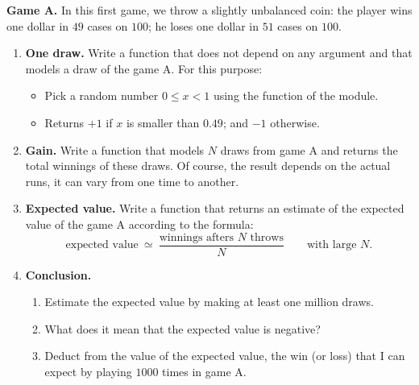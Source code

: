 \documentclass[11pt,class=report,crop=false]{standalone}
\begin{document}
\begin{activite}


\textbf{Game A.} In this first game, we throw a slightly unbalanced coin: the player wins one dollar in $49$ cases on $100$; he loses one dollar in $51$ cases on $100$.

\begin{enumerate}
  \item \textbf{One draw.}
  Write a function  that does not depend on any argument and that models a draw of the game A. For this purpose:
  \begin{itemize}
    \item Pick a random number $0 \le x < 1$ using the  function of the  module.
    \item Returns $+1$ if $x$ is smaller than $0.49$; and $-1$ otherwise.
  \end{itemize}
  
  
  \item \textbf{Gain.} Write a function  that models $N$ draws from game A and returns the total winnings of these draws. Of course, the result depends on the actual runs, it can vary from one time to another.
  
  \item \textbf{Expected value.} Write a function  that returns an estimate of the expected value of the game A according to the formula:
   $$\text{expected value} \  \simeq \  \frac{\text{winnings afters $N$ throws}}{N} \qquad \text{with large $N$}.$$   
   
  \item \textbf{Conclusion.}
  \begin{enumerate}
    \item Estimate the expected value by making at least one million draws.
    \item What does it mean that the expected value is negative?
    \item Deduct from the value of the expected value, the win (or loss) that I can expect by playing $1000$ times in game A.
  \end{enumerate}

\end{enumerate}

\end{activite}
  
\end{document}
